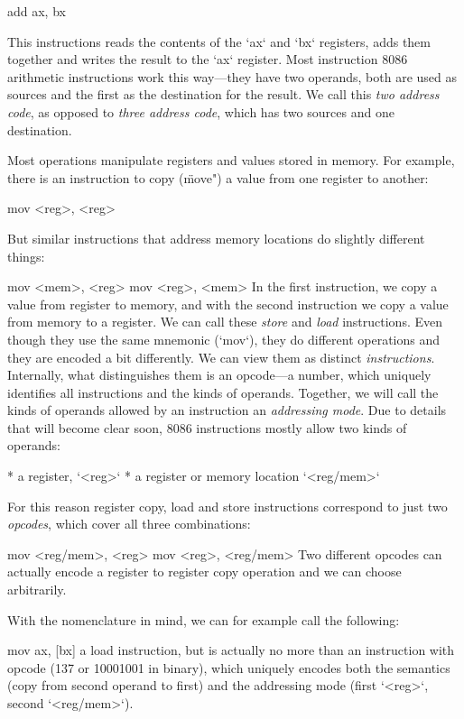 \begtt
add ax, bx
\endtt

This instructions reads the contents of the `ax` and `bx` registers, adds them
together and writes the result to the `ax` register. Most instruction 8086
arithmetic instructions work this way---they have two operands, both are used as
sources and the first as the destination for the result. We call this {\em
two address code}, as opposed to {\em three address code}, which has two sources
and one destination.

Most operations manipulate registers and values stored in memory. For example, there is
an instruction to copy (\"move") a value from one register to another:

\begtt \optparams
mov <reg>, <reg>
\endtt

But similar instructions that address memory locations do slightly different
things:

\begtt \optparams
mov <mem>, <reg>
mov <reg>, <mem>
\endtt
%
In the first instruction, we copy a value from register to memory, and with the
second instruction we copy a value from memory to a register. We can call these
{\em store} and {\em load} instructions. Even though they use the same mnemonic
(`mov`), they do different operations and they are encoded a bit differently.
We can view them as distinct {\em instructions}. Internally, what distinguishes
them is an opcode---a number, which uniquely
identifies all instructions and the kinds of operands. Together, we will call
the kinds of operands allowed by an instruction an {\em addressing mode}. Due to
details that will become clear soon, 8086 instructions mostly allow two kinds of
operands:

\begitems
* a register, `<reg>`
* a register or memory location `<reg/mem>`
\enditems

For this reason register copy, load and store instructions correspond to just
two {\em opcodes}, which cover all three combinations:

\begtt \optparams
mov <reg/mem>, <reg>
mov <reg>, <reg/mem>
\endtt
%
Two different opcodes can actually encode a register to register copy
operation and we can choose arbitrarily.

With the nomenclature in mind, we can for example call the following:

\begtt
mov ax, [bx]
\endtt
%
a load instruction, but is actually no more than an instruction
with opcode (137 or 10001001 in binary), which uniquely encodes both the
semantics (copy from second operand to first) and the addressing mode (first
`<reg>`, second `<reg/mem>`).

